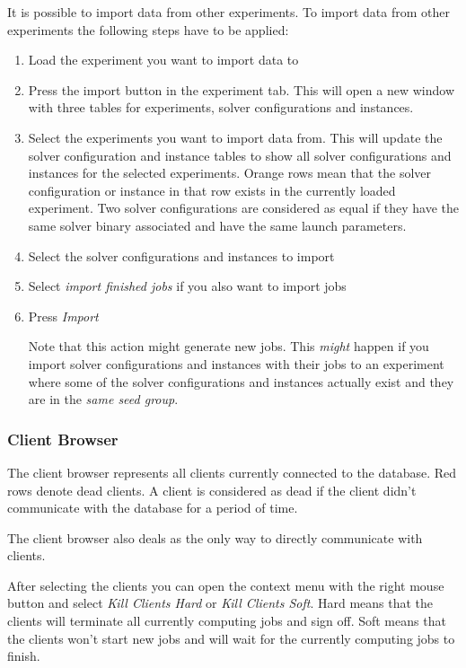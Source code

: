 \label{sec:import_data_from_experiments}
It is possible to import data from other experiments. To import data from other experiments the following steps have to be applied:
\begin{enumerate}
\item Load the experiment you want to import data to
\item Press the import button in the experiment tab. This will open a new window with three tables for experiments, solver configurations and instances.
\item Select the experiments you want to import data from. This will update the solver configuration and instance tables to show all solver configurations and instances for the selected experiments. Orange rows mean that the solver configuration or instance in that row exists in the currently loaded experiment. Two solver configurations are considered as equal if they have the same solver binary associated and have the same launch parameters.
\item Select the solver configurations and instances to import
\item Select \textit{import finished jobs} if you also want to import jobs
\item Press \textit{Import} 

\attention Note that this action might generate new jobs. This \textit{might} happen if you import solver configurations and instances with their jobs to an experiment where some of the solver configurations and instances actually exist and they are in the \textit{same seed group}.
\end{enumerate}
\subsubsection{Client Browser}
The client browser represents all clients currently connected to the database. Red rows denote dead clients. A client is considered as dead if the client didn't communicate with the database for a period of time.

The client browser also deals as the only way to directly communicate with clients. 

After selecting the clients you can open the context menu with the right mouse button and select \textit{Kill Clients Hard} or \textit{Kill Clients Soft}. Hard means that the clients will terminate all currently computing jobs and sign off. Soft means that the clients won't start new jobs and will wait for the currently computing jobs to finish.

